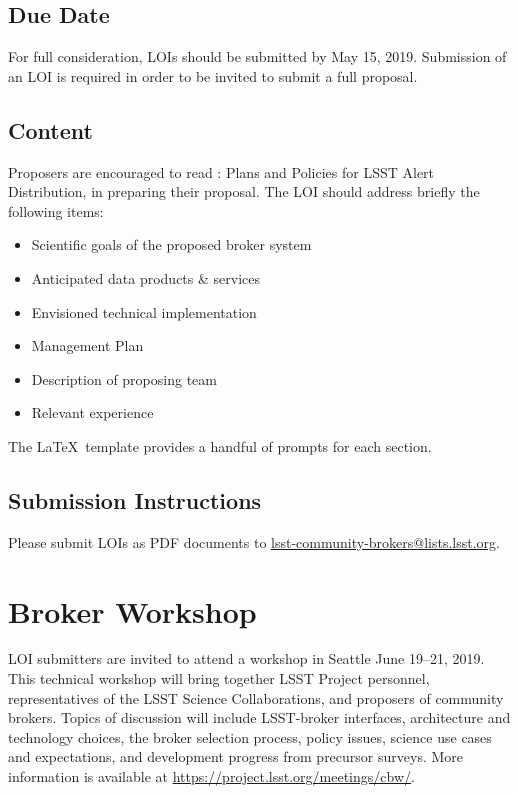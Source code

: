 \documentclass[DM,toc,lsstdraft]{lsstdoc}
\begin{document}
\subsection{Due Date}

For full consideration, LOIs should be submitted by May 15, 2019.
Submission of an LOI is required in order to be invited to submit a full proposal.

\subsection{Content}


Proposers are encouraged to read : Plans and Policies for LSST Alert Distribution, in preparing their proposal. 
The LOI should address briefly the following items:

\begin{itemize}
	\item Scientific goals of the proposed broker system
	\item Anticipated data products \& services
	\item Envisioned technical implementation
	\item Management Plan
	\item Description of proposing team
	\item Relevant experience 
\end{itemize}

The \LaTeX\ template provides a handful of prompts for each section.

\subsection{Submission Instructions}

Please submit LOIs as PDF documents to \url{lsst-community-brokers@lists.lsst.org}.

\section{Broker Workshop}


LOI submitters are invited to attend a workshop in Seattle June 19--21, 2019.
This technical workshop will bring together LSST Project personnel, representatives of the LSST Science Collaborations, and proposers of community brokers.  
Topics of discussion will include LSST-broker interfaces, architecture and technology choices, the broker selection process, policy issues, science use cases and expectations, and development progress from precursor surveys.
More information is available at \url{https://project.lsst.org/meetings/cbw/}.
\end{document}
